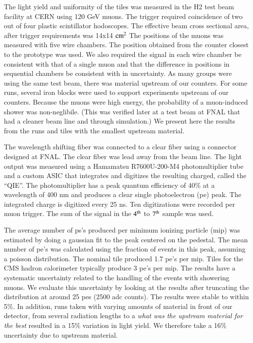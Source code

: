 \documentclass[review]{elsarticle}
\begin{document}
The light yield and uniformity of the tiles was measured in the H2 test beam facility at CERN using 120 GeV muons.  The trigger required coincidence of two out of four plastic scintillator hodoscopes. The effective beam cross sectional area, after trigger requirements was 14x14 ${\rm cm^2}$ The positions of the muons was measured with five wire chambers. The position obtained from the counter closest to the
prototype was used.  We also required the signal in each wire chamber be consistent with that of a single muon and that the difference in positions in sequential chambers be consistent with in uncertainty.
As many groups were using the same test beam, there was material upstream of our counters.  For some runs, several iron blocks were used to support experiments upstream of our counters.  Because the muons were high energy, the probability of a muon-induced shower was non-neglibile.  (This was verified later at a test beam at FNAL that had a cleaner beam line and through simulation.)  We present here the results
from the runs and tiles with the smallest upstream material.


The wavelength shifting fiber was connected to a clear fiber using a connector designed at FNAL.  The clear fiber was lead away from the beam line.
The light output was measured using a Hamamatsu R7600U-200-M4 photomultiplier tube and a custom ASIC that integrates and digitizes the resulting charged, called the ``QIE''\cite{qie}.  The photomultiplier has a peak quantum efficiency of 40\% at a wavelength of 400 nm and produces a clear single photoelectron (pe) peak.
The integrated charge is digitized every 25 ns.  Ten digitizations were recorded per muon trigger.  The sum of the signal in the ${\rm 4^{th}}$ to ${\rm 7^{th}}$ sample was used.


The average number of ps's produced per minimum ionizing particle (mip) was estimated by doing a gaussian fit to the peak centered on the pedestal.  The mean number of pe's was calculated using the fraction of events in this peak, assuming a poisson distribution.  The nominal tile produced 1.7 pe's per mip.
Tiles for the CMS hadron calorimeter typically produce 3 pe's per mip\cite{CMSHB}.
The results have a systematic uncertainty related to the handling of the events with showering muons.  We evaluate this uncertainty by looking at the results after truncating the distribution at around 25 pes (2500 adc counts).  The results were stable to within 5\%.  In addition, runs taken with varying amounts of material in front of our detector, from several radiation lengths to a {\it what was the upstream material for the best} resulted in a 15\% variation in light yield.  We therefore take a 16\% uncertainty due to upstream material.
\end{document}
